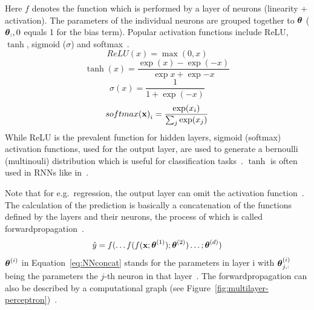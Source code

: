 Here $f$ denotes the function which is performed by a layer of neurons (linearity + activation).
The parameters of the individual neurons are grouped together to $\boldsymbol{\theta}$ ($\boldsymbol{\theta}_:,0$ equals 1 for the
bias term).
Popular activation functions include ReLU, $\tanh$, sigmoid ($\sigma$) and
softmax~\citep{shrestha_review_2019}.
\begin{equation}\label{eq:relu}
    ReLU(x)=\max(0,x)
\end{equation}
\begin{equation}\label{eq:tanh}
    \tanh(x)=\frac{\exp(x)-\exp(-x)}{\exp{x}+\exp{-x}}
\end{equation}
\begin{equation}\label{eq:sigmoid}
    \sigma(x)=\frac{1}{1+\exp(-x)}
\end{equation}
\begin{equation}\label{eq:softmax}
    {softmax(\textbf{x})}_i = \frac{\exp(x_i)}{\sum_j \exp(x_j)}
\end{equation}
While ReLU is the prevalent function for hidden layers, sigmoid (softmax) activation functions,
used for the output layer, are used to generate a bernoulli (multinouli) distribution which is
useful for classification tasks~\citep{goodfellow_deep_2016}.
$\tanh$ is often used in \acp{RNN} like in~\cite{sherstinsky_fundamentals_2020,greff_lstm_2017}.

Note that for e.g.\ regression, the output layer can omit the activation
function~\citep{goodfellow_deep_2016}.
The calculation of the prediction is basically a concatenation of the functions defined by the
layers and their neurons, the process of which is called
forwardpropagation~\citep{ponti_everything_2017,goodfellow_deep_2016}.
\begin{equation}\label{eq:NNconcat}
    \hat{y}=f(\ldots f(f(\textbf{x};\boldsymbol{\theta}^{(1)});\boldsymbol{\theta}^{(2)})\ldots;\boldsymbol{\theta}^{(d)})
\end{equation}
$\boldsymbol{\theta}^{(i)}$ in Equation~\ref{eq:NNconcat} stands for the parameters in layer i with $\boldsymbol{\theta}^{(i)}_{j,:}$
being the parameters the $j$-th neuron in that layer~\citep{goodfellow_deep_2016}.
The forwardpropagation can also be described by a computational graph (see
Figure~\ref{fig:multilayer-perceptron})~\citep{goodfellow_deep_2016}.

